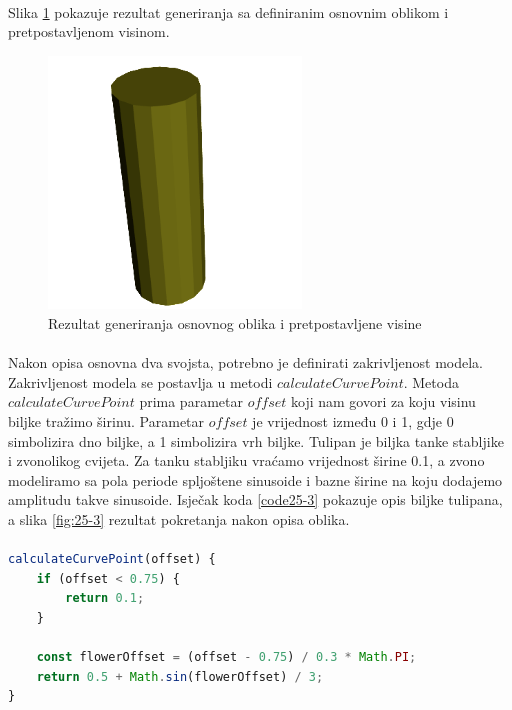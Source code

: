 \documentclass[times, utf8, diplomski]{fer}
\begin{document}
\paragraph{}
Slika \ref{fig:25-2} pokazuje rezultat generiranja sa definiranim osnovnim oblikom i 
pretpostavljenom visinom.

\begin{figure}[h]
	\centering
	\includegraphics[width=0.6\textwidth]{img/25-2}
	\caption{Rezultat generiranja osnovnog oblika i pretpostavljene visine}
	\label{fig:25-2}
\end{figure}

\paragraph{}
Nakon opisa osnovna dva svojsta, potrebno je definirati zakrivljenost modela. Zakrivljenost 
modela se postavlja u metodi $calculateCurvePoint$. Metoda $calculateCurvePoint$ prima 
parametar $offset$ koji nam govori za koju visinu biljke tražimo širinu. Parametar $offset$ 
je vrijednost između 0 i 1, gdje 0 simbolizira dno biljke, a 1 simbolizira vrh biljke.
Tulipan je biljka tanke stabljike i zvonolikog cvijeta. Za tanku stabljiku vraćamo 
vrijednost širine 0.1, a zvono modeliramo sa pola periode spljoštene sinusoide i bazne 
širine na koju dodajemo amplitudu takve sinusoide. Isječak koda \ref{code25-3} pokazuje opis 
biljke tulipana, a slika \ref{fig:25-3} rezultat pokretanja nakon opisa oblika.
\paragraph{}
\begin{lstlisting}[language=Javascript,caption=Postavljanje oblika biljke u ovisnosti o visinu od tla,label=code25-3]
calculateCurvePoint(offset) {
	if (offset < 0.75) {
		return 0.1;
	}

	const flowerOffset = (offset - 0.75) / 0.3 * Math.PI;
	return 0.5 + Math.sin(flowerOffset) / 3;
}
\end{lstlisting}
\end{document}
